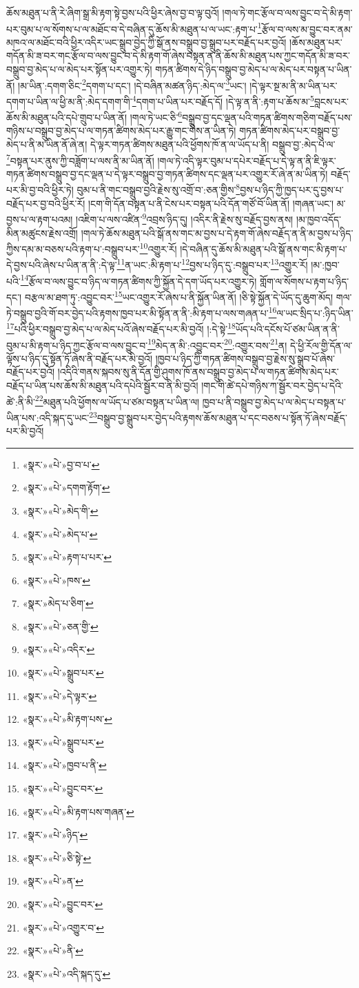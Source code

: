 ཆོས་མཐུན་པ་ནི་རེ་ཞིག་སྒྲ་མི་རྟག་སྟེ་བྱས་པའི་ཕྱིར་ཞེས་བྱ་བ་ལྟ་བུའོ། །གལ་ཏེ་གང་རྩོལ་བ་ལས་བྱུང་བ་དེ་མི་རྟག་པར་བུམ་པ་ལ་སོགས་པ་ལ་མཐོང་བ་དེ་བཞིན་དུ་ཆོས་མི་མཐུན་པ་ལ་ཡང་:རྟག་པ་\footnote{«སྣར་»«པེ་»བྱ་བ་པ་}རྩོལ་བ་ལས་མ་བྱུང་བར་ནམ་མཁའ་ལ་མཐོང་བའི་ཕྱིར་འདིར་ཡང་སྒྲུབ་བྱེད་ཀྱི་སྒོ་ནས་བསྒྲུབ་བྱ་སྒྲུབ་པར་བརྗོད་པར་བྱའོ། །ཆོས་མཐུན་པར་གདོན་མི་ཟ་བར་གང་རྩོལ་བ་ལས་བྱུང་བ་དེ་མི་རྟག་གོ་ཞེས་བསྟན་ན་ནི་ཆོས་མི་མཐུན་པས་ཀྱང་གདོན་མི་ཟ་བར་བསྒྲུབ་བྱ་མེད་པ་ལ་མེད་པར་སྟོན་པར་འགྱུར་ཏེ། གཏན་ཚིགས་དེ་ཉིད་བསྒྲུབ་བྱ་མེད་པ་ལ་མེད་པར་བསྟན་པ་ཡིན་ནོ། །མ་ཡིན་:དགག་ཅིང་\footnote{«སྣར་»«པེ་»དགག་རྟོག་}དགག་པ་དང་། །དེ་བཞིན་མཚན་ཉིད་:མེད་ལ་\footnote{«སྣར་»«པེ་»མེད་གི་}ཡང་། །དེ་ལྟར་སྔ་མ་ནི་མ་ཡིན་པར་དགག་པ་ཡིན་ལ་ཕྱི་མ་ནི་:མེད་དགག་གི་\footnote{«སྣར་»«པེ་»མེད་པ་}དགག་པ་ཡིན་པར་བརྗོད་དོ། །དེ་ལྟ་ན་ནི་:རྟག་པ་ཆོས་མ་\footnote{«སྣར་»«པེ་»རྟག་པ་པར་}བླངས་པར་ཆོས་མི་མཐུན་པའི་དཔེ་གྲུབ་པ་ཡིན་ནོ། །གལ་ཏེ་ཡང་ཅི་\footnote{«སྣར་»«པེ་»ཁས་}བསྒྲུབ་བྱ་དང་ལྡན་པའི་གཏན་ཚིགས་གཅིག་བརྗོད་པས་གཉིས་པ་བསྒྲུབ་བྱ་མེད་པ་ལ་གཏན་ཚིགས་མེད་པར་རྒྱུ་གང་གིས་ན་ཡིན་ཏེ། གཏན་ཚིགས་མེད་པར་བསྒྲུབ་བྱ་མེད་པ་ནི་མ་ཡིན་ནོ་ཞེ་ན། དེ་ལྟར་གཏན་ཚིགས་མཐུན་པའི་ཕྱོགས་ཁོ་ན་ལ་ཡོད་པ་ནི། བསྒྲུབ་བྱ་:མེད་པ་ལ་\footnote{«སྣར་»མེད་པ་ཅིག་}བསྟན་པར་ནུས་ཀྱི་བཟློག་པ་ལས་ནི་མ་ཡིན་ནོ། །གལ་ཏེ་འདི་ལྟར་བུམ་པ་དཔེར་བརྗོད་པ་དེ་ལྟ་ན་ནི་ཇི་ལྟར་གཏན་ཚིགས་བསྒྲུབ་བྱ་དང་ལྡན་པ་དེ་ལྟར་བསྒྲུབ་བྱ་གཏན་ཚིགས་དང་ལྡན་པར་འགྱུར་རོ་ཞེ་ན་མ་ཡིན་ཏེ། བརྗོད་པར་མི་བྱ་བའི་ཕྱིར་ཏེ། བུམ་པ་ནི་གང་བསྒྲུབ་བྱའི་རྗེས་སུ་འགྲོ་བ་:ཅན་གྱིས་\footnote{«སྣར་»«པེ་»ཅན་གྱི་}བྱས་པ་ཉིད་ཀྱི་ཁྱད་པར་དུ་བྱས་པ་བརྗོད་པར་བྱ་བའི་ཕྱིར་རོ། །ངག་གི་དོན་བསྟན་པ་ནི་ངེས་པར་བསྟན་པའི་དོན་གཙོ་བོ་ཡིན་ནོ། །གཞན་ཡང་། མ་བྱས་པ་ལ་རྟག་པའམ། །འཇིག་པ་ལས་འཛིན་\footnote{«སྣར་»«པེ་»འདིར་}འབྲས་ཉིད་དུ། །འདིར་ནི་རྗེས་སུ་བརྗོད་བྱས་ནས། །མ་ཁྱབ་འདོད་མིན་མཚུངས་རྗེས་འགྲོ། །གལ་ཏེ་ཆོས་མཐུན་པའི་སྒོ་ནས་གང་མ་བྱས་པ་དེ་རྟག་གོ་ཞེས་བརྗོད་ན་ནི་མ་བྱས་པ་ཉིད་ཀྱིས་དམ་མ་བཅས་པའི་རྟག་པ་:བསྒྲུབ་པར་\footnote{«སྣར་»«པེ་»སྒྲུབ་པར་}འགྱུར་རོ། །དེ་བཞིན་དུ་ཆོས་མི་མཐུན་པའི་སྒོ་ནས་གང་མི་རྟག་པ་དེ་བྱས་པའི་ཞེས་པ་ཡིན་ན་ནི་:དེ་ལྟ་\footnote{«སྣར་»«པེ་»དེ་ལྟར་}ན་ཡང་:མི་རྟག་པ་\footnote{«སྣར་»«པེ་»མི་རྟག་པས་}བྱས་པ་ཉིད་དུ་:བསྒྲུབ་པར་\footnote{«སྣར་»«པེ་»སྒྲུབ་པར་}འགྱུར་རོ། །མ་:ཁྱབ་པའི་\footnote{«སྣར་»«པེ་»ཁྱབ་པ་ནི་}རྩོལ་བ་ལས་བྱུང་བ་ཉིད་ལ་གཏན་ཚིགས་ཀྱི་སྐྱོན་དེ་དག་ཡོད་པར་འགྱུར་ཏེ། གློག་ལ་སོགས་པ་རྟག་པ་ཉིད་དང་། བརྩལ་མ་ཐག་ཏུ་:འབྱུང་བར་\footnote{«སྣར་»«པེ་»བྱུང་བར་}ཡང་འགྱུར་རོ་ཞེས་པ་ནི་སྐྱོན་ཡིན་ནོ། །ཅི་སྟེ་སྐྱོན་དེ་ཡོད་དུ་ཆུག་མོད། གལ་ཏེ་བསྒྲུབ་བྱའི་གོ་བར་བྱེད་པའི་རྟགས་ཁྱབ་པར་མི་སྟོན་ན་ནི་:མི་རྟག་པ་ལས་གཞན་པ་\footnote{«སྣར་»«པེ་»མི་རྟག་པས་གཞན་}ལ་ཡང་སྲིད་པ་:ཉིད་ཡིན་\footnote{«སྣར་»«པེ་»ཉིད་}པའི་ཕྱིར་བསྒྲུབ་བྱ་མེད་པ་ལ་མེད་པའོ་ཞེས་བརྗོད་པར་མི་བྱའོ། །:དེ་སྟེ་\footnote{«སྣར་»«པེ་»ཅི་སྟེ་}ཡོད་པའི་དངོས་པོ་ཙམ་ཡིན་ན་ནི་བུམ་པ་མི་རྟག་པ་ཉིད་ཀྱང་རྩོལ་བ་ལས་བྱུང་བ་\footnote{«སྣར་»«པེ་»ན་}མེད་ན་མི་:འབྱུང་བར་\footnote{«སྣར་»«པེ་»བྱུང་བར་}:འགྱུར་བས་\footnote{«སྣར་»«པེ་»འགྱུར་བ་}ན། དེ་ཕྱི་རོལ་གྱི་དོན་ལ་ལྟོས་པ་ཉིད་དུ་སྟོན་ཏོ་ཞེས་ནི་བརྗོད་པར་མི་བྱའོ། །ཁྱབ་པ་ཉིད་ཀྱི་གཏན་ཚིགས་བསྒྲུབ་བྱ་རྗེས་སུ་སྒྲུབ་པོ་ཞེས་བརྗོད་པར་བྱའོ། །འདིའི་གནས་སྐབས་སུ་ནི་དོན་གྱི་ཤུགས་ཁོ་ནས་བསྒྲུབ་བྱ་མེད་པ་ལ་གཏན་ཚིགས་མེད་པར་བརྗོད་པ་ཡིན་པས་ཆོས་མི་མཐུན་པའི་དཔེའི་སྦྱོར་བ་ནི་མི་བྱའོ། །གང་གི་ཚེ་དཔེ་གཉིས་ཀ་སྦྱོར་བར་བྱེད་པ་དེའི་ཚེ་:ནི་མི་\footnote{«སྣར་»«པེ་»ནི་}མཐུན་པའི་ཕྱོགས་ལ་ཡོད་པ་ཙམ་བསྟན་པ་ཡིན་ལ། ཁྱབ་པ་ནི་བསྒྲུབ་བྱ་མེད་པ་ལ་མེད་པ་བསྟན་པ་ཡིན་པས་:འདི་སྐད་དུ་ཡང་\footnote{«སྣར་»«པེ་»འདི་སྐད་དུ་}བསྒྲུབ་བྱ་སྒྲུབ་པར་བྱེད་པའི་རྟགས་ཆོས་མཐུན་པ་དང་བཅས་པ་སྟོན་ཏོ་ཞེས་བརྗོད་པར་མི་བྱའོ། 
